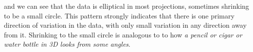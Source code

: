 \documentclass[
  letterpaper,
]{krantz}
\begin{document}
and we can see that the data is elliptical in most projections,
sometimes shrinking to be a small circle. This pattern strongly
indicates that there is one primary direction of variation in the data,
with only small variation in any direction away from it. Shrinking to
the small circle is analogous to to how \emph{a pencil or cigar or water
bottle in 3D looks from some angles}.

\begin{figure}

\begin{minipage}{0.50\linewidth}



\end{minipage}%
%
\begin{minipage}{0.50\linewidth}

\end{minipage}
\end{figure}
\end{document}
